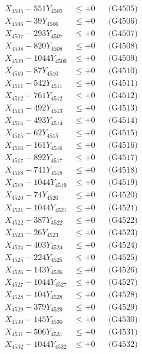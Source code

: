 \documentclass[a4paper,10pt]{article}
\begin{document}
{\begin{align}
X_{4505} - 551Y_{4505} &\leq +0 && \text{(G4505)} \\
X_{4506} - 39Y_{4506} &\leq +0 && \text{(G4506)} \\
X_{4507} - 293Y_{4507} &\leq +0 && \text{(G4507)} \\
X_{4508} - 820Y_{4508} &\leq +0 && \text{(G4508)} \\
X_{4509} - 1044Y_{4509} &\leq +0 && \text{(G4509)} \\
X_{4510} - 87Y_{4510} &\leq +0 && \text{(G4510)} \\
\allowbreak
X_{4511} - 542Y_{4511} &\leq +0 && \text{(G4511)} \\
X_{4512} - 761Y_{4512} &\leq +0 && \text{(G4512)} \\
X_{4513} - 492Y_{4513} &\leq +0 && \text{(G4513)} \\
X_{4514} - 493Y_{4514} &\leq +0 && \text{(G4514)} \\
X_{4515} - 62Y_{4515} &\leq +0 && \text{(G4515)} \\
X_{4516} - 161Y_{4516} &\leq +0 && \text{(G4516)} \\
X_{4517} - 892Y_{4517} &\leq +0 && \text{(G4517)} \\
X_{4518} - 741Y_{4518} &\leq +0 && \text{(G4518)} \\
X_{4519} - 1044Y_{4519} &\leq +0 && \text{(G4519)} \\
X_{4520} - 74Y_{4520} &\leq +0 && \text{(G4520)} \\
\allowbreak
X_{4521} - 1044Y_{4521} &\leq +0 && \text{(G4521)} \\
X_{4522} - 387Y_{4522} &\leq +0 && \text{(G4522)} \\
X_{4523} - 26Y_{4523} &\leq +0 && \text{(G4523)} \\
X_{4524} - 403Y_{4524} &\leq +0 && \text{(G4524)} \\
X_{4525} - 224Y_{4525} &\leq +0 && \text{(G4525)} \\
X_{4526} - 143Y_{4526} &\leq +0 && \text{(G4526)} \\
X_{4527} - 1044Y_{4527} &\leq +0 && \text{(G4527)} \\
X_{4528} - 104Y_{4528} &\leq +0 && \text{(G4528)} \\
X_{4529} - 379Y_{4529} &\leq +0 && \text{(G4529)} \\
X_{4530} - 145Y_{4530} &\leq +0 && \text{(G4530)} \\
\allowbreak
X_{4531} - 506Y_{4531} &\leq +0 && \text{(G4531)} \\
X_{4532} - 1044Y_{4532} &\leq +0 && \text{(G4532)} \\

\end{align}}
\end{document}
